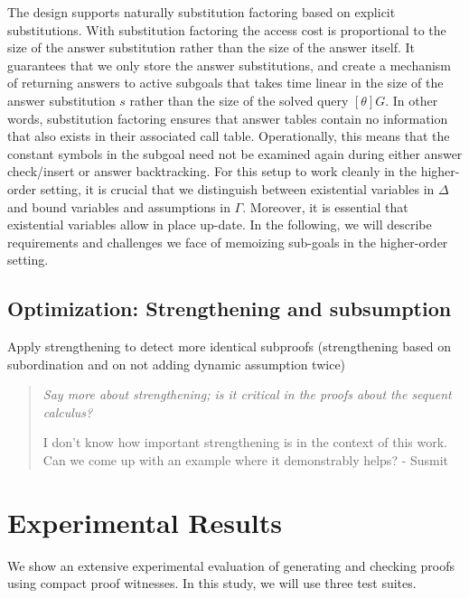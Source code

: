 \documentclass{acmconf}
\newenvironment{note}{\begin{quote}\message{note!}\it}{\end{quote}}
\begin{document}
The design supports naturally substitution factoring based on explicit
substitutions\cite{RamakrishnanJLP99}. With substitution factoring the
access cost is proportional to the size of the answer substitution
rather than the size of the answer itself. It guarantees that we only
store the answer substitutions, and create a mechanism of returning
answers to active subgoals that takes time linear in the size of the
answer substitution $s$ rather than the size of the solved query
$[\theta]G$. In other words, substitution factoring ensures that answer
tables contain no information that also exists in their associated
call table. Operationally, this means that the constant symbols in the
subgoal need not be examined again during either answer check/insert
or answer backtracking. For this setup to work
cleanly in the higher-order setting, it is crucial that we distinguish
between existential variables in $\Delta$ and bound variables and
assumptions in $\Gamma$. Moreover, it is essential that existential
variables allow in place up-date.  In the following, we will describe
requirements and challenges we face of memoizing sub-goals in the
higher-order setting. 

\subsection{Optimization: Strengthening and subsumption}

Apply strengthening to detect more identical subproofs (strengthening
based on subordination and on not adding dynamic assumption twice)

\begin{note}
  Say more about strengthening; is it critical in the proofs about the
  sequent calculus?  

  I don't know how important strengthening is in the context of this work.
  Can we come up with an example where it demonstrably helps? - Susmit
\end{note}
\section{Experimental Results}

We show an extensive experimental evaluation of generating and
checking proofs using compact proof witnesses. In this study, we will
use three test suites.
\end{document}
